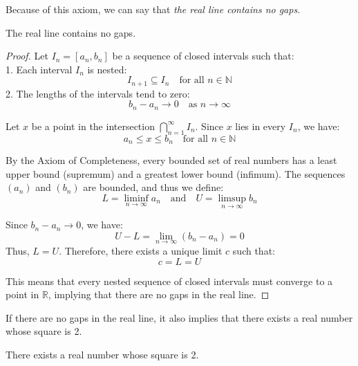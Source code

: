 Because of this axiom, we can say that \textit{the real line contains no gaps}. \\

\begin{theorem}
    The real line contains no gaps.
\end{theorem}

\begin{proof}

Let \( I_n = [a_n, b_n] \) be a sequence of closed intervals such that: \\

1. Each interval \( I_n \) is nested: 
   \[
   I_{n+1} \subseteq I_n \quad \text{for all } n \in \mathbb{N}
   \]
2. The lengths of the intervals tend to zero:
   \[
   b_n - a_n \to 0 \quad \text{as } n \to \infty
   \]

Let \( x \) be a point in the intersection $\bigcap_{n=1}^{\infty} I_n $. Since \( x \) lies in every \( I_n \), we have:
\[
a_n \leq x \leq b_n \quad \text{for all } n \in \mathbb{N}
\]

By the Axiom of Completeness, every bounded set of real numbers has a least upper bound (supremum) and a greatest lower bound (infimum). The sequences \( (a_n) \) and \( (b_n) \) are bounded, and thus we define:
\[
L = \liminf_{n \to \infty} a_n \quad \text{and} \quad U = \limsup_{n \to \infty} b_n
\]

Since \( b_n - a_n \to 0 \), we have:
\[
U - L = \lim_{n \to \infty} (b_n - a_n) = 0
\]
Thus, \( L = U \). Therefore, there exists a unique limit \( c \) such that:
\[
c = L = U
\]

This means that every nested sequence of closed intervals must converge to a point in \( \mathbb{R} \), implying that there are no gaps in the real line.
    
\end{proof}

If there are no gaps in the real line, it also implies that there exists a real number whose square is 2. 

\begin{theorem}
    There exists a real number whose square is 2.
\end{theorem}

